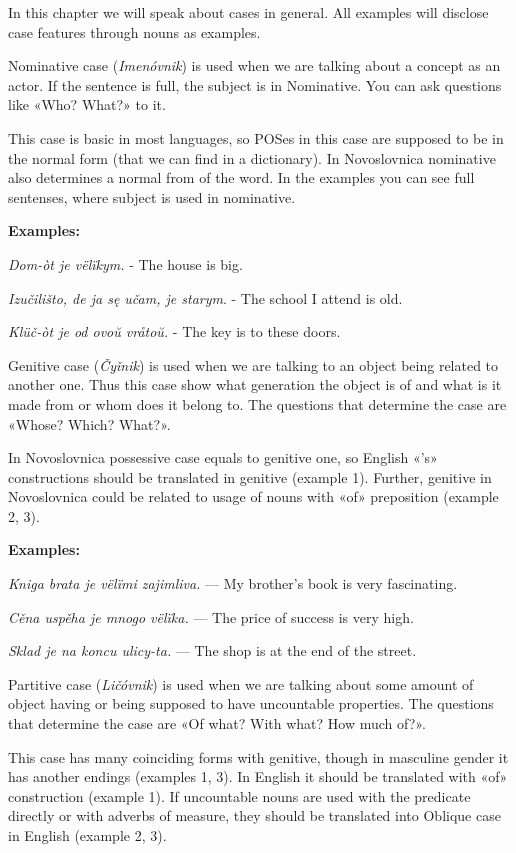 In this chapter we will speak about cases in general. All examples will disclose case features through nouns as examples.

Nominative case (\textit{Imenóvnik}) is used when we are talking about a concept as an actor. If the sentence is full, the subject is in Nominative. You can ask questions like «Who? What?» to it.

This case is basic in most languages, so POSes in this case are supposed to be in the normal form (that we can find in a dictionary). In Novoslovnica nominative also determines a normal from of the word. In the examples you can see full sentenses, where subject is used in nominative.

\textbf{Examples:}

\textit{Dom-òt je vëlïkym.} - The house is big.

\textit{Izučilišto, de ja sę učam, je starym}. - The school I attend is old.

\textit{Klüč-òt je od ovoŭ vråtoŭ.} - The key is to these doors.

Genitive case (\textit{Čyǐnik}) is used when we are talking to an object being related to another one. Thus this case show what generation the object is of and what is it made from or whom does it belong to. The questions that determine the case are «Whose? Which? What?».

In Novoslovnica possessive case equals to genitive one, so English «'s» constructions should be translated in genitive (example 1). Further, genitive in Novoslovnica could be related to usage of nouns with «of» preposition (example 2, 3).

\textbf{Examples:}

\textit{Kniga brata je vëlïmi zajimliva.} — My brother's book is very fascinating.

\textit{Cěna uspěha je mnogo vëlïka.} — The price of success is very high.

\textit{Sklad je na koncu ulicy-ta.} — The shop is at the end of the street.

Partitive case (\textit{Ličóvnik}) is used when we are talking about some amount of object having or being supposed to have uncountable properties. The questions that determine the case are «Of what? With what? How much of?».

This case has many coinciding forms with genitive, though in masculine gender it has another endings (examples 1, 3). In English it should be translated with «of» construction (example 1). If uncountable nouns are used with the predicate directly or with adverbs of measure, they should be translated into Oblique case in English (example 2, 3).


